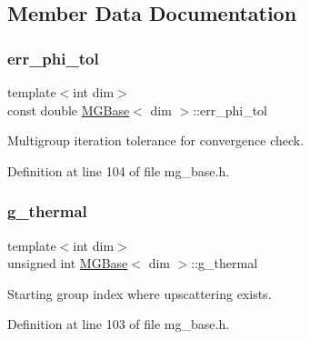 \subsection{Member Data Documentation}
\mbox{\label{class_m_g_base_af50b1bdc92270c342524eacfc644170c}} 
\subsubsection{\texorpdfstring{err\+\_\+phi\+\_\+tol}{err\_phi\_tol}}
{\footnotesize\ttfamily template$<$int dim$>$ \\
const double \hyperlink{class_m_g_base}{M\+G\+Base}$<$ dim $>$\+::err\+\_\+phi\+\_\+tol\hspace{0.3cm}{\ttfamily [protected]}}



Multigroup iteration tolerance for convergence check. 



Definition at line 104 of file mg\+\_\+base.\+h.

\mbox{\label{class_m_g_base_a7df1f6ce51cf6eb033420be98b1f0019}} 
\subsubsection{\texorpdfstring{g\+\_\+thermal}{g\_thermal}}
{\footnotesize\ttfamily template$<$int dim$>$ \\
unsigned int \hyperlink{class_m_g_base}{M\+G\+Base}$<$ dim $>$\+::g\+\_\+thermal\hspace{0.3cm}{\ttfamily [protected]}}



Starting group index where upscattering exists. 



Definition at line 103 of file mg\+\_\+base.\+h.

\mbox{\label{class_m_g_base_ad8a9d4163bb31470fff74fe787c23788}} 
